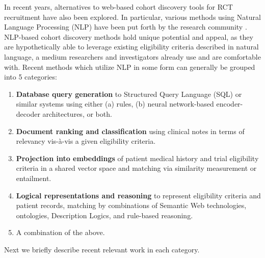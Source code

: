 \documentclass[../main.tex]{subfiles}
\begin{document}
\noindent In recent years, alternatives to web-based cohort discovery tools for RCT recruitment have also been explored. In particular, various methods using Natural Language Processing (NLP) have been put forth by the research community \cite{yuan2019criteria2query, soni2020patient, fang2022combining, zhang2020deepenroll, chen2019clinical, patrao2015recruit, dhayne2021emr2vec, liu2021evaluating, xiong2019cohort}. NLP-based cohort discovery methods hold unique potential and appeal, as they are hypothetically able to leverage existing eligibility criteria described in natural language, a medium researchers and investigators already use and are comfortable with. Recent methods which utilize NLP in some form can generally be grouped into 5 categories:

\begin{enumerate}
    \item{\textbf{Database query generation} to Structured Query Language (SQL) or similar systems using either (a) rules, (b) neural network-based encoder-decoder architectures}, or both.
    \item{\textbf{Document ranking and classification} using clinical notes in terms of relevancy vis-à-vis a given eligibility criteria.}
    \item{\textbf{Projection into embeddings} of patient medical history and trial eligibility criteria in a shared vector space and matching via similarity measurement or entailment.}
    \item{\textbf{Logical representations and reasoning} to represent eligibility criteria and patient records, matching by combinations of Semantic Web technologies, ontologies, Description Logics, and rule-based reasoning.}
    \item{A combination of the above.}
\end{enumerate}

\noindent Next we briefly describe recent relevant work in each category. \\
\end{document}
